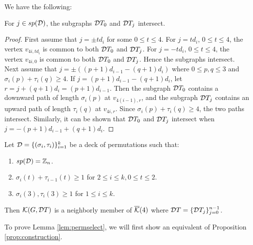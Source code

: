 \documentclass[11pt]{article}
\newcommand{\mb}{\mathbb}
\newcommand{\tr}[1]{{\cal D}T_#1}
\begin{document}
We have the following:
\begin{lemma}\label{lem:span}
For $j\in sp({\cal D})$, the subgraphs $\tr{0}$ and $\tr{j}$ intersect.
\end{lemma}
\begin{proof}
First assume that $j=\pm td_i$ for some $0\leq t\leq 4$. For $j=td_i$,
$0\leq t\leq 4$, the vertex $v_{4i,td_i}$ is common to both $\tr{0}$ and
$\tr{j}$. For $j=-td_i$, $0\leq t\leq 4$, the vertex $v_{4i,0}$ is common
to both $\tr{0}$ and $\tr{j}$. Hence the subgraphs intersect. Next assume that
$j=\pm ((p+1)d_{i-1}-(q+1)d_i)$ where $0\leq p,q\leq 3$ and
$\sigma_i(p)+\tau_i(q)\geq 4$. If $j=(p+1)d_{i-1}-(q+1)d_i$, let
$r=j+(q+1)d_i=(p+1)d_{i-1}$. Then the subgraph $\tr{0}$ contains a downward
path of length $\sigma_i(p)$ at $v_{4(i-1),r}$, and the subgraph $\tr{j}$
contains an upward path of length $\tau_i(q)$ at $v_{4i,r}$. Since
$\sigma_i(p)+\tau_i(q)\geq 4$, the two paths intersect. Similarly, it can
be shown that $\tr{0}$ and $\tr{j}$ intersect when
$j=-(p+1)d_{i-1}+(q+1)d_i$.  
\end{proof}

\begin{lemma}\label{lem:permselect}
Let ${\cal D}=\{(\sigma_i,\tau_i)\}_{i=1}^k$ be a deck of permutations such
that:
\begin{enumerate}[{\rm (a)}]
\item $sp({\cal D}) = \mb{Z}_n$.
\item $\sigma_{i}(t)+\tau_{i-1}(t)\geq 1$ for $2\leq i\leq k, 0\leq t\leq 2$. 
\item $\sigma_{i}(3),\tau_{i}(3) \geq 1$ for $1\leq i\leq k$.
\end{enumerate}
Then ${\cal K}(G,{\cal D}T)$ is a neighborly member of $\overline{\cal K}(4)$ where  ${\cal D}T = \{\tr{j}\}_{j=0}^{n-1}$.
\end{lemma}

To prove Lemma \ref{lem:permselect}, we will first show an equivalent of
Proposition \ref{prop:construction}.
\end{document}
